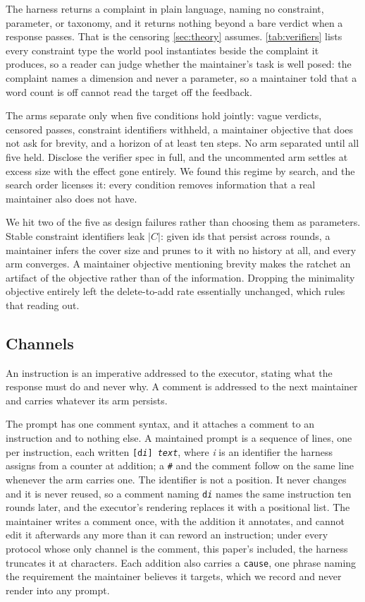 The harness returns a complaint in plain language, naming no constraint, parameter, or taxonomy,
and it returns nothing beyond a bare verdict when a response passes. That is the censoring
\autoref{sec:theory} assumes. \autoref{tab:verifiers} lists every constraint type the world pool
instantiates beside the complaint it produces, so a reader can judge whether the maintainer's task
is well posed: the complaint names a dimension and never a parameter, so a maintainer told that a
word count is off cannot read the target off the feedback.

The arms separate only when five conditions hold jointly: vague verdicts, censored passes,
constraint identifiers withheld, a maintainer objective that does not ask for brevity, and a
horizon of at least ten steps. No arm separated until all five held. Disclose the verifier spec in
full, and the uncommented arm settles at \RegimeNullControlExcessPct{} excess size with the effect
gone entirely. We found this regime by search, and the search order licenses it: every condition
removes information that a real maintainer also does not have.

We hit two of the five as design failures rather than choosing them as parameters. Stable
constraint identifiers leak $|C|$: given ids that persist across rounds, a maintainer infers the
cover size and prunes to it with no history at all, and every arm converges. A maintainer objective
mentioning brevity makes the ratchet an artifact of the objective rather than of the information.
Dropping the minimality objective entirely left the delete-to-add rate essentially unchanged, which
rules that reading out.



\subsection{Channels}
\label{sec:appendix:channels}

An instruction is an imperative addressed to the executor, stating what the response must do and
never why. A comment is addressed to the next maintainer and carries whatever its arm persists.

The prompt has one comment syntax, and it attaches a comment to an instruction and to nothing else.
A maintained prompt is a sequence of lines, one per instruction, each written
\texttt{[d\emph{i}] \emph{text}}, where \emph{i} is an identifier the harness assigns from a
counter at addition; a \texttt{\#} and the comment follow on the same line whenever the arm carries
one. The identifier is not a position. It never changes and it is never reused, so a comment naming
\texttt{d\emph{i}} names the same instruction ten rounds later, and the executor's rendering
replaces it with a positional list. The maintainer writes a comment once, with the addition it
annotates, and cannot edit it afterwards any more than it can reword an instruction; under every
protocol whose only channel is the comment, this paper's included, the harness truncates it at
\LabCommentCap{} characters. Each addition also carries a \texttt{cause}, one phrase naming the
requirement the maintainer believes it targets, which we record and never render into any prompt.

